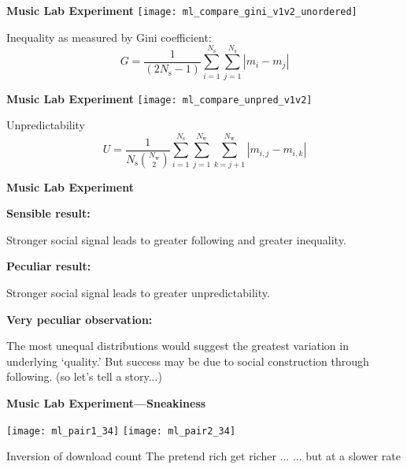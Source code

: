   \textbf{Music Lab Experiment}
  \centering
  \texttt{[image: ml\_compare\_gini\_v1v2\_unordered]}

  
   Inequality as measured by Gini coefficient:
    $$
    G= \frac{1}{(2N_{\textrm{s}}-1)} \sum_{i=1}^{N_{\textrm{s}}} \sum_{j=1}^{N_{\textrm{s}}} | m_i - m_j |    
    $$
  


  \textbf{Music Lab Experiment}
  \centering
  \texttt{[image: ml\_compare\_unpred\_v1v2]}

  
    Unpredictability
    $$ 
    U = 
    \frac{1}
    {N_{\textrm{s}}\binom{N_{\textrm{w}}}{2}}
    \sum_{i=1}^{N_{\textrm{s}}}
    \sum_{j=1}^{N_{\textrm{w}}}
    \sum_{k=j+1}^{N_{\textrm{w}}}
    | m_{i,j} - m_{i,k} |  
    $$
  


  \textbf{Music Lab Experiment}

  \textbf{Sensible result:}
  
   Stronger social signal leads to \alert{greater following and greater inequality}.
  
  

  \textbf{Peculiar result:}
  
   Stronger social signal leads to greater \alert{unpredictability}.
  
  

  \textbf{Very peculiar observation:}
  
   The most unequal distributions would suggest the greatest
    variation in underlying `quality.'
   But success may be due to social construction through \alert{following}.
    {\alert{(so let's tell a story...\cite{sunstein2006a,taleb2007a}})}
  
  




  \textbf{Music Lab Experiment---Sneakiness}

  \texttt{[image: ml\_pair1\_34]}
  \texttt{[image: ml\_pair2\_34]}

  
    Inversion of download count
    The pretend rich get richer ...
    ... but at a slower rate
  


